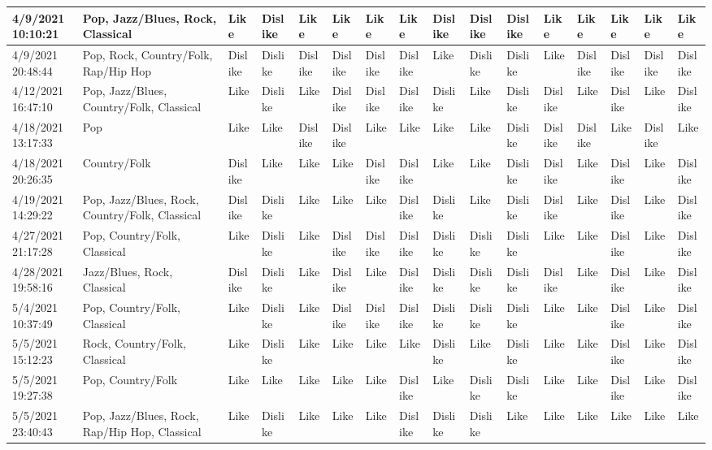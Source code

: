 \begin{table}
\begin{tabular}{|l|l|l|l|l|l|l|l|l|l|l|l|l|l|l|l|}
        4/9/2021 10:10:21 & Pop, Jazz/Blues, Rock, Classical & Like & Dislike & Like & Like & Like & Like & Dislike & Dislike & Dislike & Like & Like & Like & Like & Like \\ \hline
        4/9/2021 20:48:44 & Pop, Rock, Country/Folk, Rap/Hip Hop & Dislike & Dislike & Dislike & Dislike & Dislike & Dislike & Like & Dislike & Dislike & Like & Dislike & Dislike & Dislike & Dislike \\ \hline
        4/12/2021 16:47:10 & Pop, Jazz/Blues, Country/Folk, Classical & Like & Dislike & Like & Dislike & Dislike & Dislike & Dislike & Like & Dislike & Dislike & Like & Dislike & Like & Dislike \\ \hline
        4/18/2021 13:17:33 & Pop & Like & Like & Dislike & Dislike & Like & Like & Like & Like & Dislike & Dislike & Dislike & Like & Dislike & Like \\ \hline
        4/18/2021 20:26:35 & Country/Folk & Dislike & Like & Like & Like & Dislike & Dislike & Like & Like & Dislike & Dislike & Like & Dislike & Like & Dislike \\ \hline
        4/19/2021 14:29:22 & Pop, Jazz/Blues, Rock, Country/Folk, Classical & Dislike & Dislike & Like & Like & Like & Dislike & Dislike & Like & Dislike & Dislike & Like & Dislike & Like & Dislike \\ \hline
        4/27/2021 21:17:28 & Pop, Country/Folk, Classical & Like & Dislike & Like & Dislike & Dislike & Dislike & Dislike & Dislike & Dislike & Like & Like & Dislike & Like & Dislike \\ \hline
        4/28/2021 19:58:16 & Jazz/Blues, Rock, Classical & Dislike & Dislike & Like & Dislike & Like & Dislike & Dislike & Dislike & Dislike & Dislike & Like & Dislike & Like & Dislike \\ \hline
        5/4/2021 10:37:49 & Pop, Country/Folk, Classical & Like & Dislike & Like & Dislike & Dislike & Dislike & Dislike & Dislike & Dislike & Like & Like & Dislike & Like & Dislike \\ \hline
        5/5/2021 15:12:23 & Rock, Country/Folk, Classical & Like & Dislike & Like & Like & Like & Like & Dislike & Like & Dislike & Like & Like & Dislike & Like & Dislike \\ \hline
        5/5/2021 19:27:38 & Pop, Country/Folk & Like & Like & Like & Like & Like & Dislike & Like & Dislike & Dislike & Like & Like & Dislike & Like & Dislike \\ \hline
        5/5/2021 23:40:43 & Pop, Jazz/Blues, Rock, Rap/Hip Hop, Classical & Like & Dislike & Like & Like & Like & Dislike & Dislike & Dislike & Like & Like & Like & Like & Like & Like \\ \hline

\end{tabular}
\end{table}
